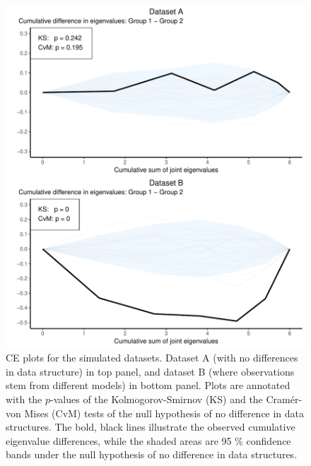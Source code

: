 \documentclass[a4paper,12pt]{article}
\begin{document}
\begin{figure}[H]
\center
\includegraphics[scale=0.8]{Figure2_v3.pdf}
\caption{CE plots for the simulated datasets. Dataset A (with no differences in data structure) in top panel, and dataset B (where observations stem from different models) in bottom panel. Plots are annotated with the $p$-values of the Kolmogorov-Smirnov (KS) and the Cram\'er-von Mises (CvM) tests of the null hypothesis of no difference in data structures. The bold, black lines illustrate the observed cumulative eigenvalue differences, while the shaded areas are 95 \% confidence bands under the null hypothesis of no difference in data structures.}
\label{plot.simCE} 
\end{figure}
\end{document}
